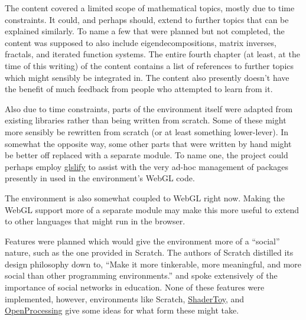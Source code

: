 \documentclass{sig-alternate-05-2015}
\begin{document}
The content covered a limited scope of mathematical topics, mostly due
to time constraints.  It could, and perhaps should, extend to further
topics that can be explained similarly.  To name a few that were
planned but not completed, the content was supposed to also include
eigendecompositions, matrix inverses, fractals, and iterated function
systems.  The entire fourth chapter (at least, at the time of this
writing) of the content contains a list of references to further
topics which might sensibly be integrated in.  The content also
presently doesn't have the benefit of much feedback from people who
attempted to learn from it.

Also due to time constraints, parts of the environment itself were
adapted from existing libraries rather than being written from
scratch.  Some of these might more sensibly be rewritten from scratch
(or at least something lower-lever).  In somewhat the opposite way,
some other parts that were written by hand might be better off
replaced with a separate module.  To name one, the project could
perhaps employ \href{https://github.com/stackgl/glslify}{glslify} to
assist with the very ad-hoc management of packages presently in used
in the environment's WebGL code.

The environment is also somewhat coupled to WebGL right now.  Making
the WebGL support more of a separate module may make this more useful
to extend to other languages that might run in the browser.

Features were planned which would give the environment more of a
``social'' nature, such as the one provided in Scratch.  The authors
of Scratch distilled its design philosophy down to, ``Make it more
tinkerable, more meaningful, and more social than other programming
environments.''\cite{Resnick2009} and spoke extensively of the
importance of social networks in education.  None of these features
were implemented, however, environments like Scratch,
\href{https://www.shadertoy.com/}{ShaderToy}, and
\href{https://www.openprocessing.org/}{OpenProcessing} give some ideas
for what form these might take.

 
\end{document}

